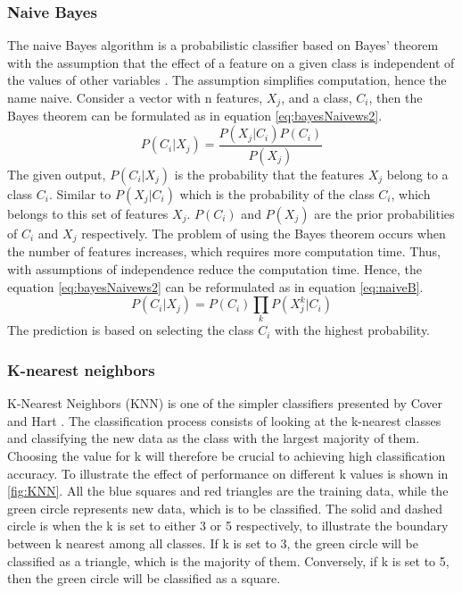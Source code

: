 \documentclass[USenglish]{ifimaster}  %
\begin{document}
\subsubsection{Naive Bayes}
The naive Bayes algorithm is a probabilistic classifier based on Bayes’ theorem with the assumption that the effect of a feature on a given class is independent of the values of other variables \cite{Marsland:2009:MLA:1571643}. The assumption simplifies computation, hence the name naive. Consider a vector with n features, $X_j$, and a class, $C_i$, then the Bayes theorem can be formulated as in equation \ref{eq:bayesNaivews2}.
\begin{equation} 
P(C_i \vert X_j) = \frac{P(X_j \vert C_i)P(C_i)}{P(X_j)}
\label{eq:bayesNaivews2}
\end{equation}
The given output, $P(C_i \vert X_j)$ is the probability that the features $X_j$ belong to a class $C_i$. Similar to $P(X_j \vert C_i)$ which is the probability of the class $C_i$, which belongs to this set of features $X_j$.  $P(C_i)$ and $P(X_j)$ are the prior probabilities of $C_i$ and $X_j$ respectively. The problem of using the Bayes theorem occurs when the number of features increases, which requires more computation time. Thus, with assumptions of independence reduce the computation time. Hence, the equation \ref{eq:bayesNaivews2} can be reformulated as in equation \ref{eq:naiveB}.
\begin{equation} 
P(C_i \vert X_j)  = P(C_i)\prod_{k}P(X_{j}^{k} \vert C_i)
\label{eq:naiveB}
\end{equation}
The prediction is based on selecting the class $C_i$ with the highest probability.

\subsubsection{K-nearest neighbors}
K-Nearest Neighbors (KNN) is one of the simpler classifiers presented by Cover and Hart \cite{1053964}. The classification process consists of looking at the k-nearest classes and classifying the new data as the class with the largest majority of them. Choosing the value for k will therefore be crucial to achieving high classification accuracy. To illustrate the effect of performance on different k values is shown in \ref{fig:KNN}. All the blue squares and red triangles are the training data, while the green circle represents new data, which is to be classified. The solid and dashed circle is when the k is set to either 3 or 5 respectively, to illustrate the boundary between k nearest among all classes. If k is set to 3, the green circle will be classified as a triangle, which is the majority of them. Conversely, if k is set to 5, then the green circle will be classified as a square.
\end{document}

